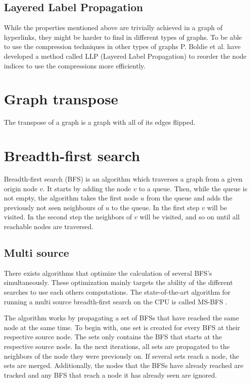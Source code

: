 \subsection{Layered Label Propagation}

While the properties mentioned above are trivially achieved in a graph of hyperlinks, they might be harder to find in different types of graphs. To be able to use the compression techniques in other types of graphs P. Boldie et al. have developed a method called LLP (Layered Label Propagation) \cite{llp} to reorder the node indices to use the compressions more efficiently. 

\section{Graph transpose}
The transpose of a graph is a graph with all of its edges flipped. 

\section{Breadth-first search}
Breadth-first search (BFS) is an algorithm which traverses a graph from a given origin node $v$. It starts by adding the node $v$ to a queue. Then, while the queue is not empty, the algorithm takes the first node $u$ from the queue and adds the previously not seen neighbours of $u$ to the queue. In the first step $v$ will be visited. In the second step the neighbors of $v$ will be visited, and so on until all reachable nodes are traversed.

\subsection{Multi source}
There exists algorithms that optimize the calculation of several BFS's simultaneously. These optimization mainly targets the ability of the different searches to use each others computations. The state-of-the-art algorithm for running a multi source breadth-first search on the CPU is called MS-BFS \cite{msbfs}.

The algorithm works by propagating a set of BFSs that have reached the same node at the same time. To begin with, one set is created for every BFS at their respective source node. The sets only contains the BFS that starts at the respective source node. In the next iterations, all sets are propagated to the neighbors of the node they were previously on. If several sets reach a node, the sets are merged. Additionally, the nodes that the BFSs have already reached are tracked and any BFS that reach a node it has already seen are ignored. 

